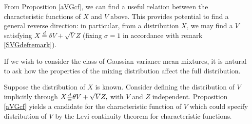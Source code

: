 \documentclass{article}
\begin{document}
\begin{remark}\label{chartochar}
    From Proposition \ref{aVGcf}, we can find a useful relation between the characteristic functions of $X$ and $V$ above. This provides potential to find a general reverse direction: in particular, from a distribution $X$, we may find a $V$ satisfying $X\overset{d}{=}\theta V + \sqrt{V}Z$ (fixing $\sigma=1$ in accordance with remark \ref{SVGdefremark}).

    If we wish to consider the class of Gaussian variance-mean mixtures, it is natural to ask how the properties of the mixing distribution affect the full distribution. 
\end{remark}
Suppose the distribution of $X$ is known. Consider defining the distribution of $V$ implicitly through $X {d \over =} \theta V + \sqrt{V} Z,$ with $V$ and $Z$ independent. Proposition \ref{aVGcf} yields a candidate for the characteristic function of $V$ which could specify distribution of $V$ by the Levi continuity theorem for characteristic functions. 
\end{document}

